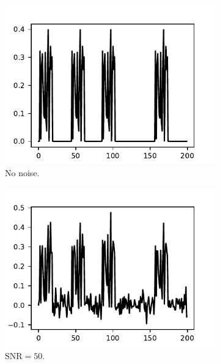 \documentclass{article}
\begin{document}
\begin{figure}[!tb]
	\begin{subfigure}[ht]{0.30\textwidth}
		\centering
		\includegraphics[width=\columnwidth]{figures/y_clean.pdf}
		\caption{No noise.}
	\end{subfigure}
	\hfill
	\begin{subfigure}[ht]{0.30\textwidth}
		\centering
		\includegraphics[width=\columnwidth]{figures/y_SNR50.pdf}
		\caption{$\text{SNR} = 50$.}
	\end{subfigure}
	\hfill
	\begin{subfigure}[ht]{0.30\textwidth}
		\centering

\end{subfigure}
\end{figure}
\end{document}
